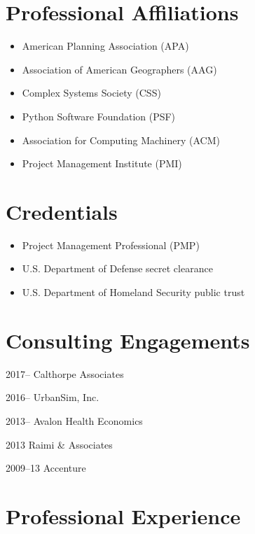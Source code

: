 \documentclass{academiccv}
\begin{document}
\section*{Professional Affiliations}

\begin{itemize}
\item American Planning Association (APA)
\item Association of American Geographers (AAG)
\item Complex Systems Society (CSS)
\item Python Software Foundation (PSF)
\item Association for Computing Machinery (ACM)
\item Project Management Institute (PMI)
\end{itemize}



\section*{Credentials}

\begin{itemize}
\item Project Management Professional (PMP)
\item U.S. Department of Defense secret clearance
\item U.S. Department of Homeland Security public trust
\end{itemize}



\section*{Consulting Engagements}

\begin{tablist}
\item[2017--]   \tab Calthorpe Associates
\item[2016--]   \tab UrbanSim, Inc.
\item[2013--]   \tab Avalon Health Economics
\item[2013]     \tab Raimi \& Associates
\item[2009--13] \tab Accenture
\end{tablist}



\section*{Professional Experience}
\end{document}
